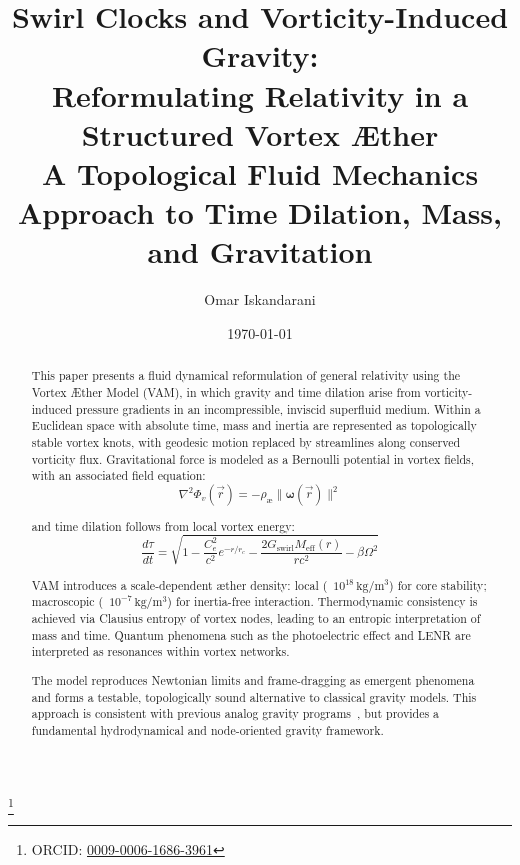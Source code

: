 \documentclass[a4paper, aps,preprint,superscriptaddress, 12pt]{revtex4}
\begin{document}
\author{Omar Iskandarani}
\title{
    Swirl Clocks and Vorticity-Induced Gravity:\\
    Reformulating Relativity in a Structured Vortex Æther\\
    \textnormal{\normalsize A Topological Fluid Mechanics Approach to Time Dilation, Mass, and Gravitation}
}

\date{\today}
\thanks{ORCID: \href{https://orcid.org/0009-0006-1686-3961}{0009-0006-1686-3961}}


\begin{abstract}
    This paper presents a fluid dynamical reformulation of general relativity using the Vortex Æther Model (VAM), in which gravity and time dilation arise from vorticity-induced pressure gradients in an incompressible, inviscid superfluid medium. Within a Euclidean space with absolute time, mass and inertia are represented as topologically stable vortex knots, with geodesic motion replaced by streamlines along conserved vorticity flux. Gravitational force is modeled as a Bernoulli potential in vortex fields, with an associated field equation:
    \begin{equation*}
        \nabla^2 \Phi_v(\vec{r}) = -\rho_\text{\ae} \|\boldsymbol{\omega}(\vec{r})\|^2
    \end{equation*}

    and time dilation follows from local vortex energy:
    \begin{equation*}
        \frac{d\tau}{dt} = \sqrt{1 - \frac{C_e^2}{c^2} e^{-r/r_c} - \frac{2G_\text{swirl} M_\text{eff}(r)}{rc^2} - \beta \Omega^2}
    \end{equation*}

    VAM introduces a scale-dependent æther density: local (~$10^{18}\,\mathrm{kg/m^3}$) for core stability; macroscopic (~$10^{-7}\,\mathrm{kg/m^3}$) for inertia-free interaction. Thermodynamic consistency is achieved via Clausius entropy of vortex nodes, leading to an entropic interpretation of mass and time. Quantum phenomena such as the photoelectric effect and LENR are interpreted as resonances within vortex networks.

    The model reproduces Newtonian limits and frame-dragging as emergent phenomena and forms a testable, topologically sound alternative to classical gravity models. This approach is consistent with previous analog gravity programs~\cite{barcelo2011analogue,volovik2009universe}, but provides a fundamental hydrodynamical and node-oriented gravity framework.
\end{abstract}
\end{document}
